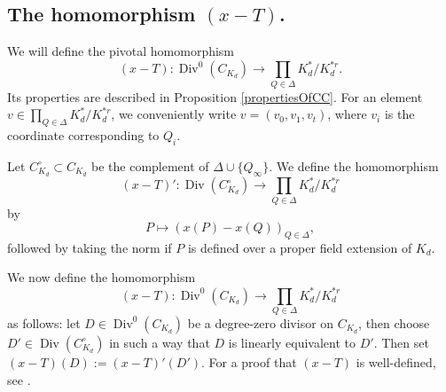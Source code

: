 \documentclass[reqno]{amsart}
\theoremstyle{definition}
\theoremstyle{remark}
\newcommand{\Div}{\operatorname{Div}}
\newcommand{\XminusT}{(x-T)}
\newcommand{\xminusT}{(x-T)'}
\begin{document}
\subsection{The homomorphism $\XminusT$.}

We will define the pivotal homomorphism
$$
\XminusT : \Div^0(C_{K_d}) \rightarrow \prod_{Q \in \Delta} K_d^{\ast}/K_d^{\ast r}.
$$
Its properties are described in Proposition \ref{propertiesOfCC}.  For an element $v \in \prod_{Q \in \Delta} K_d^{\ast}/K_d^{\ast r}$, we conveniently write $v = (v_0,v_1,v_t)$, where $v_i$ is the coordinate corresponding to $Q_i$.

Let $C_{K_d}^\circ \subset C_{K_d}$ be the complement of $\Delta \cup \{ Q_\infty \}$. We define the homomorphism
$$
\xminusT : \Div(C_{K_d}^\circ) \rightarrow \prod_{Q \in \Delta} K_d^{\ast}/K_d^{\ast r}
$$
by 
$$
P \mapsto \left( x(P) - x(Q) \right)_{Q \in \Delta},
$$
followed by taking the norm if $P$ is defined over a proper field extension of $K_d$. 

We now define the homomorphism 
$$
\XminusT : \Div^0(C_{K_d}) \rightarrow \prod_{Q \in \Delta} K_d^{\ast}/K_d^{\ast r}
$$
as follows: let $D \in \Div^0(C_{K_d})$ be a degree-zero divisor on $C_{K_d}$, then choose $D' \in \Div(C_{K_d}^\circ)$ in such a way that $D$ is linearly equivalent to $D'$. Then set $\XminusT(D) := \xminusT(D')$. For a proof that $\XminusT$ is well-defined, see \cite[6.2.2]{bps}.
\end{document}
